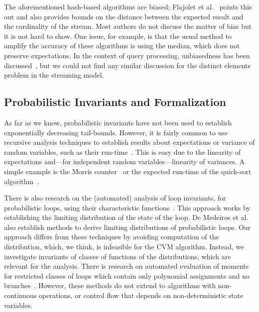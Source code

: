 \documentclass[a4paper,UKenglish,cleveref, autoref, thm-restate]{lipics-v2021}
\begin{document}
The aforementioned hash-based algorithms are biased; Flajolet et al.~\cite{flajolet1985} points this out and also provides bounds on the distance between the expected result and the cardinality of the stream.
Most authors do not discuss the matter of bias but it is not hard to show.
One issue, for example, is that the usual method to amplify the accuracy of these algorithms is using the median, which does not preserve expectations.
In the context of query processing, unbiasedness has been discussed~\cite[Section 2.1]{haas1995}, but we could not find any similar discussion for the distinct elements problem in the streaming model.

\subsection{Probabilistic Invariants and Formalization}
As far as we know, probabilistic invariants have not been used to establish exponentially decreasing tail-bounds.
However, it is fairly common to use recursive analysis techniques to establish results about expectations or variance of random variables, such as their run-time~\cite[Section 1.4]{motwani1995}.
This is easy due to the linearity of expectations and---for independent random variables---linearity of variances.
A simple example is the Morris counter~\cite{morris1978} or the expected run-time of the quick-sort algorithm~\cite[Section 2.5]{mitzenmacher2017}.

There is also research on the (automated) analysis of loop invariants, for probabilistic loops, using their characteristic functions~\cite{batz2023, mciver2005}.
This approach works by establishing the limiting distribution of the state of the loop.
De Medeiros et al.~\cite[Section 3.2]{demedeiros2024} also establish methods to derive limiting distributions of probabilistic loops.
Our approach differs from these techniques by avoiding computation of the distribution, which, we think, is infeasible for the CVM algorithm.
Instead, we investigate invariants of classes of functions of the distributions, which are relevant for the analysis.
There is research on automated evaluation of moments for restricted classes of loops which contain only polynomial assignments and no branches~\cite{bartocci2019,kofnov2022}.
However, these methods do not extend to algorithms with non-continuous operations, or control flow that depends on non-deterministic state variables.
\end{document}
